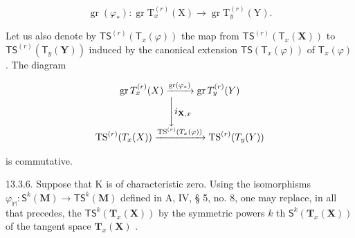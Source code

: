 \[
\operatorname{gr} \left(\varphi_ {*}\right): \operatorname{gr} \mathrm{T} _ {x} ^ {(r)} (\mathrm{X}) \rightarrow \operatorname{gr} \mathrm{T} _ {y} ^ {(r)} (\mathrm{Y}).
\]

Let us also denote by \(\mathsf{TS}^{(r)}(\mathsf{T}_x(\varphi))\) the map from \(\mathsf{TS}^{(r)}(\mathsf{T}_x(\mathbf{X}))\) to \(\mathsf{TS}^{(r)}(\mathsf{T}_y(\mathbf{Y}))\) induced by the canonical extension \(\mathsf{TS}(\mathsf{T}_x(\varphi))\) of \(\mathsf{T}_x(\varphi)\) . The diagram

\[
\begin{array}{c} \operatorname{gr} T _ {x} ^ {(r)} (X) \xrightarrow {\operatorname{gr} (\varphi_ {*})} \operatorname{gr} T _ {y} ^ {(r)} (Y) \\ \Biggl \downarrow i _ {\mathbf {X}, x} \\ \operatorname{TS} ^ {(r)} (T _ {x} (X)) \xrightarrow {\operatorname{TS} ^ {(r)} (T _ {x} (\varphi))} \operatorname{TS} ^ {(r)} (T _ {y} (Y)) \end{array}
\]

is commutative.

13.3.6. Suppose that K is of characteristic zero. Using the isomorphisms \(\varphi_{\mathbb{M}}: \mathsf{S}^k(\mathbf{M}) \to \mathsf{TS}^k(\mathbf{M})\) defined in A, IV, § 5, no. 8, one may replace, in all that precedes, the \(\mathsf{TS}^k(\mathbf{T}_x(\mathbf{X}))\) by the symmetric powers \(k\) th \(\mathsf{S}^k(\mathbf{T}_x(\mathbf{X}))\) of the tangent space \(\mathbf{T}_x(\mathbf{X})\) .

